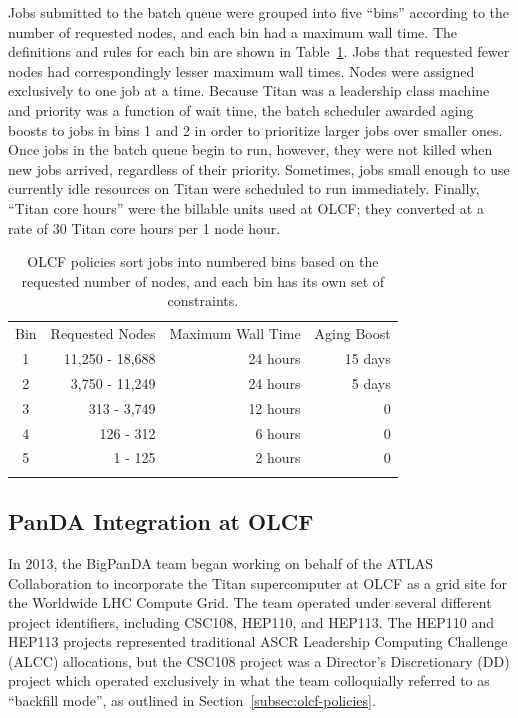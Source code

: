 Jobs submitted to the batch queue were grouped into five ``bins'' according to
the number of requested nodes, and each bin had a maximum wall time. The
definitions and rules for each bin are shown in Table~\ref{tab:olcf-bins}. Jobs
that requested fewer nodes had correspondingly lesser maximum wall times. Nodes
were assigned exclusively to one job at a time. Because Titan was a leadership
class machine and priority was a function of wait time, the batch scheduler
awarded aging boosts to jobs in bins 1 and 2 in order to prioritize larger jobs
over smaller ones. Once jobs in the batch queue begin to run, however, they
were not killed when new jobs arrived, regardless of their priority. Sometimes,
jobs small enough to use currently idle resources on Titan were scheduled to
run immediately. Finally, ``Titan core hours'' were the billable units used at
OLCF; they converted at a rate of 30 Titan core hours per 1 node hour.

\begin{table}
\caption{OLCF policies sort jobs into numbered bins based on the requested
number of nodes, and each bin has its own set of constraints.}
\label{tab:olcf-bins}       %
\begin{tabular}{crrr}
\hline\noalign{\smallskip}
Bin & Requested Nodes   & Maximum Wall Time &   Aging Boost \\
\noalign{\smallskip}\hline\noalign{\smallskip}
1   &   11,250 - 18,688 &   24 hours        &   15 days     \\
2   &    3,750 - 11,249 &   24 hours        &    5 days     \\
3   &       313 - 3,749 &   12 hours        &         0     \\
4   &         126 - 312 &    6 hours        &         0     \\
5   &           1 - 125 &    2 hours        &         0     \\
\noalign{\smallskip}\hline
\end{tabular}
\end{table}

\subsection{PanDA Integration at OLCF}
\label{subsec:panda-at-olcf}

In 2013, the BigPanDA team began working on behalf of the ATLAS Collaboration
to incorporate the Titan supercomputer at OLCF as a grid site for the Worldwide
LHC Compute Grid. The team operated under several different project
identifiers, including CSC108, HEP110, and HEP113. The HEP110 and HEP113
projects represented traditional ASCR Leadership Computing Challenge (ALCC)
allocations, but the CSC108 project was a Director's Discretionary (DD) project
which operated exclusively in what the team colloquially referred to as
``backfill mode'', as outlined in Section~\ref{subsec:olcf-policies}.

